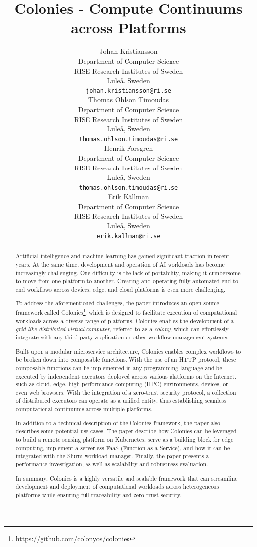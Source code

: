 \documentclass{article}
\title{Colonies - Compute Continuums across Platforms}
\author{{\hspace{1mm}Johan Kristiansson} \\
	Department of Computer Science \\
	RISE Research Institutes of Sweden \\
	Luleå, Sweden \\
	\texttt{johan.kristiansson@ri.se} \\
	\And
	{\hspace{1mm}Thomas Ohlson Timoudas} \\
	Department of Computer Science \\
	RISE Research Institutes of Sweden \\
	Luleå, Sweden \\
	\texttt{thomas.ohlson.timoudas@ri.se} \\
	\And
	{\hspace{1mm}Henrik Forsgren} \\
	Department of Computer Science \\
	RISE Research Institutes of Sweden \\
	Luleå, Sweden \\
	\texttt{thomas.ohlson.timoudas@ri.se} \\
	\And
	{\hspace{1mm}Erik Källman} \\
	Department of Computer Science \\
	RISE Research Institutes of Sweden \\
	Luleå, Sweden \\
	\texttt{erik.kallman@ri.se} \\
}
\begin{document}
\maketitle

\begin{abstract}
Artificial intelligence and machine learning has gained significant traction in recent years. At the same time, development and operation of AI workloads has become increasingly challenging. One difficulty is the lack of portability, making it cumbersome to move from one platform to another. Creating and operating fully automated end-to-end workflows across devices, edge, and cloud platforms is even more challenging.

To address the aforementioned challenges, the paper introduces an open-source framework called Colonies\footnote{https://github.com/colonyos/colonies}, which is designed to facilitate execution of computational workloads across a diverse range of platforms. Colonies enables the development of a \emph{grid-like distributed virtual computer}, referred to as a \emph{colony}, which can effortlessly integrate with any third-party application or other workflow management systems.

Built upon a modular microservice architecture, Colonies enables complex workflows to be broken down into composable functions. With the use of an HTTP protocol, these composable functions can be implemented in any programming language and be executed by independent executors deployed across various platforms on the Internet, such as cloud, edge, high-performance computing (HPC) environments, devices, or even web browsers. With the integration of a zero-trust security protocol, a collection of distributed executors can operate as a unified entity, thus establishing seamless computational continuums across multiple platforms.

In addition to a technical description of the Colonies framework, the paper also describes some potential use cases. The paper describe how Colonies can be leveraged to build a remote sensing platform on Kubernetes, serve as a building block for edge computing, implement a serverless FaaS (Function-as-a-Service), and how it can be integrated with the Slurm workload manager. Finally, the paper presents a performance investigation, as well as scalability and robustness evaluation. 

In summary, Colonies is a highly versatile and scalable framework that can streamline development and deployment of computational workloads across heterogeneous platforms while ensuring full traceability and zero-trust security.
\end{abstract}
\end{document}

